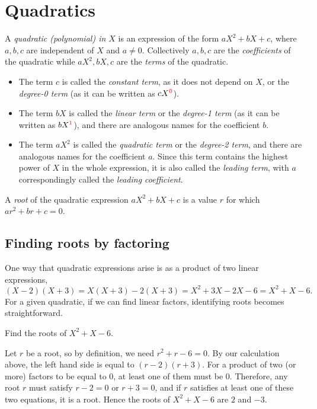 \section{Quadratics}

A \emph{quadratic (polynomial) in $X$} is an expression of the form $aX^2 + bX + c$, where $a,b,c$ are independent of $X$ and $a\neq 0$. Collectively $a,b,c$ are the \emph{coefficients} of the quadratic while $aX^2, bX, c$ are the \emph{terms} of the quadratic.
\begin{itemize}
\item The term $c$ is called the \emph{constant term}, as it does not depend on $X$, or the \emph{degree-0 term} (as it can be written as $cX^{\color{red}0}$).
\item The term $bX$ is called the \emph{linear term} or the \emph{degree-1 term} (as it can be written as $bX^{\color{red}1}$), and there are analogous names for the coefficient $b$.
\item The term $aX^2$ is called the \emph{quadratic term} or the \emph{degree-2 term}, and there are analogous names for the coefficient $a$. Since this term contains the highest power of $X$ in the whole expression, it is also called the \emph{leading term}, with $a$ correspondingly called the \emph{leading coefficient}.
\end{itemize}
A \emph{root} of the quadratic expression $aX^2 + bX + c$ is a value $r$ for which $ar^2 + br + c = 0$.

\subsection{Finding roots by factoring}

One way that quadratic expressions arise is as a product of two linear expressions,
\begin{equation*}
(X - 2)(X + 3) = X(X + 3) - 2(X + 3) = X^2 + 3X - 2X - 6 = X^2 + X - 6. 
\end{equation*}
For a given quadratic, if we can find linear factors, identifying roots becomes straightforward.

\begin{example}
Find the roots of $X^2 + X - 6$. 
\end{example}
\begin{solution}
Let $r$ be a root, so by definition, we need $r^2 + r - 6 = 0$. By our calculation above, the left hand side is equal to $(r - 2)(r + 3)$. For a product of two (or more) factors to be equal to $0$, at least one of them must be $0$. Therefore, any root $r$ must satisfy $r - 2 = 0$ or $r + 3 = 0$, and if $r$ satisfies at least one of these two equations, it is a root. Hence the roots of $X^2 + X - 6$ are $2$ and $-3$.
\end{solution}

